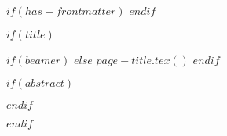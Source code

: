 $if(has-frontmatter)$
  \frontmatter
$endif$

$if(title)$

  $if(beamer)$
    \frame{\titlepage}
  $else$
    $page-title.tex()$
  $endif$

  $if(abstract)$
    \begin{abstract}
      $abstract$
    \end{abstract}
  $endif$

$endif$
